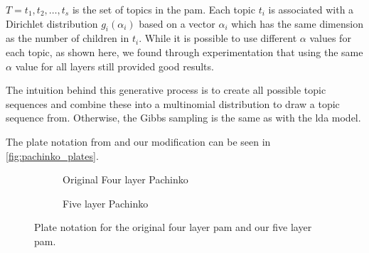$T = {t_1, t_2, \dots, t_s}$ is the set of topics in the \gls{pam}. 
Each topic $t_i$ is associated with a Dirichlet distribution $g_i(\alpha_i)$ based on a vector $\alpha_i$ which has the same dimension as the number of children in $t_i$.
While it is possible to use different $\alpha$ values for each topic, as shown here, we found through experimentation that using the same $\alpha$ value for all layers still provided good results.

The intuition behind this generative process is to create all possible topic sequences and combine these into a multinomial distribution to draw a topic sequence from.
Otherwise, the Gibbs sampling is the same as with the \gls{lda} model.

The plate notation from \citet{li2006pachinko} and our modification can be seen in \autoref{fig:pachinko_plates}.

\begin{figure*}[ht]
	\centering
	\begin{subfigure}{0.40\textwidth}
		\centering
		\resizebox{\textwidth}{!}{%
			
		}
		\caption{Original Four layer Pachinko}
		\label{fig:four_layer_pachinko}
	\end{subfigure}
	\hspace{1em}
	\begin{subfigure}{0.40\textwidth}
		\centering
		\resizebox{\textwidth}{!}{%
			
		}
		\caption{Five layer Pachinko}
		\label{fig:five_layer_pachinko}
	\end{subfigure}
	\caption{Plate notation for the original four layer \gls{pam} and our five layer \gls{pam}.}
	\label{fig:pachinko_plates}
\end{figure*}

